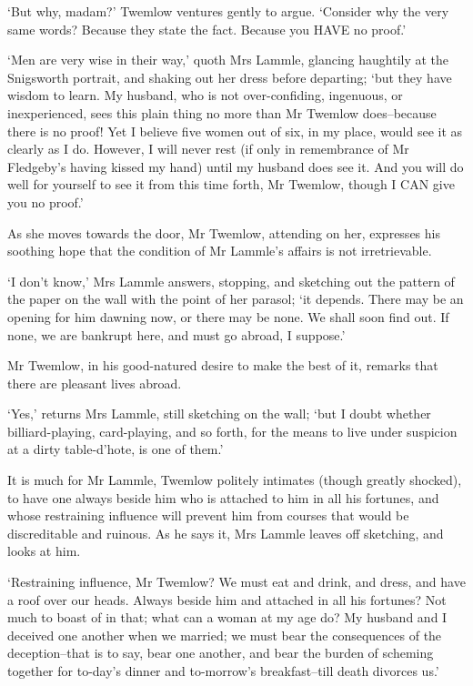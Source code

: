 ‘But why, madam?’ Twemlow ventures gently to argue. ‘Consider why
the very same words? Because they state the fact. Because you HAVE no
proof.’

‘Men are very wise in their way,’ quoth Mrs Lammle, glancing haughtily
at the Snigsworth portrait, and shaking out her dress before departing;
‘but they have wisdom to learn. My husband, who is not over-confiding,
ingenuous, or inexperienced, sees this plain thing no more than Mr
Twemlow does--because there is no proof! Yet I believe five women out of
six, in my place, would see it as clearly as I do. However, I will never
rest (if only in remembrance of Mr Fledgeby’s having kissed my hand)
until my husband does see it. And you will do well for yourself to see
it from this time forth, Mr Twemlow, though I CAN give you no proof.’

As she moves towards the door, Mr Twemlow, attending on her, expresses
his soothing hope that the condition of Mr Lammle’s affairs is not
irretrievable.

‘I don’t know,’ Mrs Lammle answers, stopping, and sketching out the
pattern of the paper on the wall with the point of her parasol; ‘it
depends. There may be an opening for him dawning now, or there may be
none. We shall soon find out. If none, we are bankrupt here, and must go
abroad, I suppose.’

Mr Twemlow, in his good-natured desire to make the best of it, remarks
that there are pleasant lives abroad.

‘Yes,’ returns Mrs Lammle, still sketching on the wall; ‘but I doubt
whether billiard-playing, card-playing, and so forth, for the means to
live under suspicion at a dirty table-d’hote, is one of them.’

It is much for Mr Lammle, Twemlow politely intimates (though greatly
shocked), to have one always beside him who is attached to him in all
his fortunes, and whose restraining influence will prevent him from
courses that would be discreditable and ruinous. As he says it, Mrs
Lammle leaves off sketching, and looks at him.

‘Restraining influence, Mr Twemlow? We must eat and drink, and dress,
and have a roof over our heads. Always beside him and attached in all
his fortunes? Not much to boast of in that; what can a woman at my age
do? My husband and I deceived one another when we married; we must bear
the consequences of the deception--that is to say, bear one another, and
bear the burden of scheming together for to-day’s dinner and to-morrow’s
breakfast--till death divorces us.’

